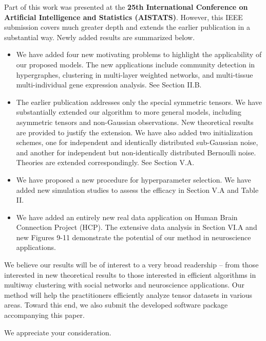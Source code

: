 \documentclass{article}[12pt]
\begin{document}
Part of this work was presented at the {\bf 25th International Conference on Artificial Intelligence and Statistics (AISTATS)}. However, this IEEE submission covers much greater depth and extends the earlier publication in a substantial way. Newly added results are summarized below.
\begin{itemize}[topsep=0ex]
\item We have added four new motivating problems to highlight the applicability of our proposed models. The new applications include community detection in hypergraphes, clustering in multi-layer weighted networks, and multi-tissue multi-individual gene expression analysis. See Section II.B.

\item The earlier publication addresses only the special symmetric tensors. We have substantially extended our algorithm to more general models, including asymmetric tensors and non-Gaussian observations. New theoretical results are provided to justify the extension. We have also added two initialization schemes, one for independent and identically distributed sub-Gaussian noise, and another for independent but non-identically distributed Bernoulli noise. Theories are extended correspondingly. See Section V.A.

\item We have proposed a new procedure for hyperparameter selection. We have added new simulation studies to assess the efficacy in Section V.A and Table II.

\item We have added an entirely new real data application on Human Brain Connection Project (HCP). The extensive data analysis in Section VI.A and new Figures 9-11 demonstrate the potential of our method in neuroscience applications.
\end{itemize}

We believe our results will be of interest to a very broad readership – from those interested in new theoretical results to those interested in efficient algorithms in multiway clustering with social networks and neuroscience applications. Our method will help the practitioners efficiently analyze tensor datasets in various areas. Toward this end, we also submit the developed software package accompanying this paper.

We appreciate your consideration.
\end{document}
